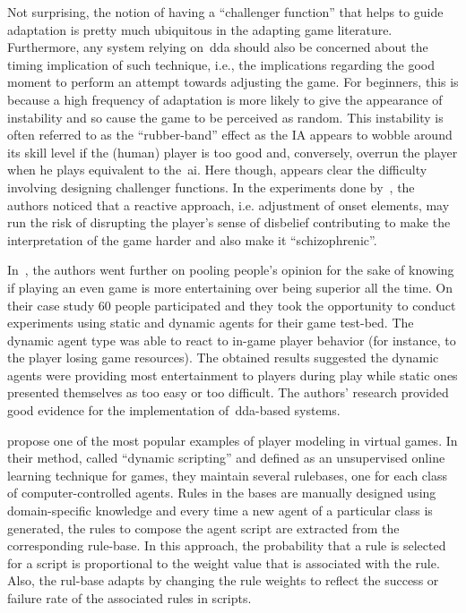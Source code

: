 Not surprising, the notion of having a ``challenger function'' that helps to guide adaptation is pretty much ubiquitous in the adapting game literature. Furthermore, any system relying on~\gls{dda} should also be concerned about the timing implication of such technique, i.e., the implications regarding the good moment to perform an attempt towards adjusting the game. For beginners, this is because a high frequency of adaptation is more likely to give the appearance of instability and so cause the game to be perceived as random. This instability is often referred to as the ``rubber-band'' effect as the IA appears to wobble around its skill level if the (human) player is too good and, conversely, overrun the player when he plays equivalent to the~\gls{ai}. Here though, appears clear the difficulty involving designing challenger functions. In the experiments done by~\cite{hunicke_ai_2004}, the authors noticed that a reactive approach, i.e. adjustment of onset elements, may run the risk of disrupting the player's sense of disbelief contributing to make the interpretation of the game harder and also make it ``schizophrenic''.%

In~\cite{hagelback_measuring_2009}, the authors went further on pooling people's opinion for the sake of knowing if playing an even game is more entertaining over being superior all the time. On their case study 60 people participated and they took the opportunity to conduct experiments using static and dynamic agents for their game test-bed. The dynamic agent type was able to react to in-game player behavior (for instance, to the player losing game resources). The obtained results suggested the dynamic agents were providing most entertainment to players during play while static ones presented themselves as too easy or too difficult. The authors' research provided good evidence for the implementation of~\gls{dda}-based systems.

\cite{spronck_-line_2004} propose one of the most popular examples of player modeling in virtual games. In their method, called ``dynamic scripting'' and defined as an unsupervised online learning technique for games, they maintain several rulebases, one for each class of computer-controlled agents. Rules in the bases are manually designed using domain-specific knowledge and every time a new agent of a particular class is generated, the rules to compose the agent script are extracted from the corresponding rule-base. In this approach, the probability that a rule is selected for a script is proportional to the weight value that is associated with the rule. Also, the rul-base adapts by changing the rule weights to reflect the success or failure rate of the associated rules in scripts. %

